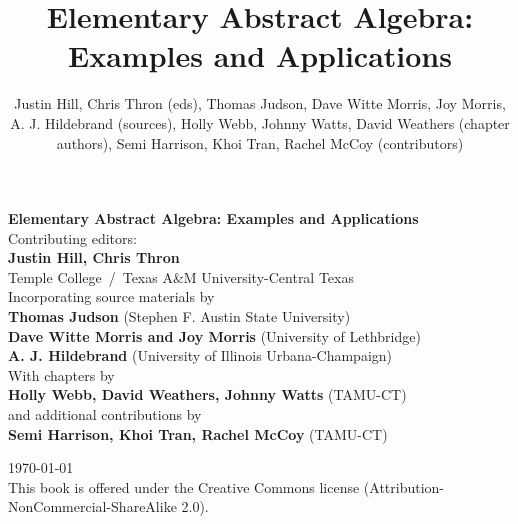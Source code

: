 \documentclass[11pt]{book}
\numberwithin{equation}{section}
\begin{document}
%
\begin{titlepage}
\title{Elementary Abstract Algebra: Examples and Applications}
\author{Justin Hill, Chris Thron (eds), Thomas Judson, Dave Witte Morris, Joy Morris, A. J. Hildebrand (sources), Holly Webb, Johnny Watts, David Weathers (chapter authors), Semi Harrison, Khoi Tran, Rachel McCoy (contributors)}
\begin{center}
\vspace{3.5cm}
{\huge \textbf{ Elementary Abstract Algebra: Examples and Applications}}\\[1cm]
Contributing editors: \\ [0.5 cm]
{ \textbf{Justin Hill, Chris Thron } } \\
Temple College~/~Texas A\&M University-Central Texas \\[0.4cm]
Incorporating source materials by\\[0.4cm]
\textbf{Thomas Judson} (Stephen F. Austin State University) \\
\textbf{Dave Witte  Morris and Joy Morris} (University of Lethbridge) \\
\textbf{A. J. Hildebrand} (University of Illinois Urbana-Champaign) \\
[0.4cm]
With chapters by\\[0.4cm]
\textbf {Holly Webb, David Weathers, Johnny Watts} (TAMU-CT)\\
[0.4cm]
and additional contributions by\\[0.4cm]
\textbf{Semi Harrison, Khoi Tran, Rachel McCoy} (TAMU-CT)
\vfill

{\large \today}\\ [1 cm]
This book is offered under the Creative Commons license (Attribution-NonCommercial-ShareAlike 2.0).

\end{center}
\end{titlepage}
\vspace{4cm}
\end{document}
